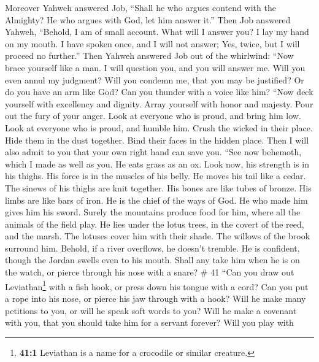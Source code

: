 Moreover Yahweh answered Job,  ``Shall he who argues
contend with the Almighty? He who argues with God, let him answer it.''
 Then Job answered Yahweh,  ``Behold, I am
of small account. What will I answer you? I lay my hand on my mouth.
 I have spoken once, and I will not answer; Yes, twice,
but I will proceed no further.''  Then Yahweh answered Job
out of the whirlwind:  ``Now brace yourself like a man. I
will question you, and you will answer me.  Will you even
annul my judgment? Will you condemn me, that you may be justified?
 Or do you have an arm like God? Can you thunder with a
voice like him?  ``Now deck yourself with excellency and
dignity. Array yourself with honor and majesty.  Pour out
the fury of your anger. Look at everyone who is proud, and bring him
low.  Look at everyone who is proud, and humble him.
Crush the wicked in their place.  Hide them in the dust
together. Bind their faces in the hidden place.  Then I
will also admit to you that your own right hand can save you.
 ``See now behemoth, which I made as well as you. He eats
grass as an ox.  Look now, his strength is in his thighs.
His force is in the muscles of his belly.  He moves his
tail like a cedar. The sinews of his thighs are knit together.
 His bones are like tubes of bronze. His limbs are like
bars of iron.  He is the chief of the ways of God. He who
made him gives him his sword.  Surely the mountains
produce food for him, where all the animals of the field play.
 He lies under the lotus trees, in the covert of the
reed, and the marsh.  The lotuses cover him with their
shade. The willows of the brook surround him.  Behold, if
a river overflows, he doesn't tremble. He is confident, though the
Jordan swells even to his mouth.  Shall any take him when
he is on the watch, or pierce through his nose with a snare? \# 41
 ``Can you draw out Leviathan\footnote{\textbf{41:1}
  Leviathan is a name for a crocodile or similar creature.} with a fish
hook, or press down his tongue with a cord?  Can you put a
rope into his nose, or pierce his jaw through with a hook?
 Will he make many petitions to you, or will he speak soft
words to you?  Will he make a covenant with you, that you
should take him for a servant forever?  Will you play with
